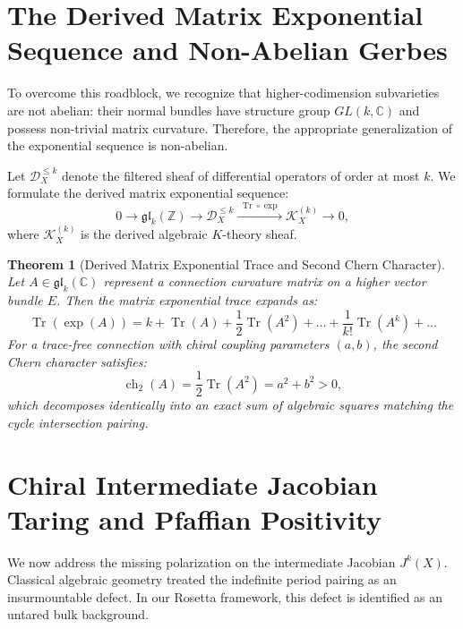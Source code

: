 \documentclass[11pt,a4paper]{article}
\newtheorem{theorem}{Theorem}[section]
\theoremstyle{definition}
\begin{document}
\section{The Derived Matrix Exponential Sequence and Non-Abelian Gerbes}

To overcome this roadblock, we recognize that higher-codimension subvarieties are not abelian: their normal bundles have structure group $GL(k, \mathbb{C})$ and possess non-trivial matrix curvature. Therefore, the appropriate generalization of the exponential sequence is non-abelian.

Let $\mathcal{D}_X^{\le k}$ denote the filtered sheaf of differential operators of order at most $k$. We formulate the derived matrix exponential sequence:
\begin{equation}
0 \longrightarrow \mathfrak{gl}_k(\mathbb{Z}) \longrightarrow \mathcal{D}_X^{\le k} \xrightarrow{\;\operatorname{Tr} \circ \exp\;} \mathcal{K}_X^{(k)} \longrightarrow 0,
\end{equation}
where $\mathcal{K}_X^{(k)}$ is the derived algebraic $K$-theory sheaf.

\begin{theorem}[Derived Matrix Exponential Trace and Second Chern Character]
Let $A \in \mathfrak{gl}_k(\mathbb{C})$ represent a connection curvature matrix on a higher vector bundle $E$. Then the matrix exponential trace expands as:
\begin{equation}
\operatorname{Tr}(\exp(A)) = k + \operatorname{Tr}(A) + \frac{1}{2}\operatorname{Tr}(A^2) + \dots + \frac{1}{k!}\operatorname{Tr}(A^k) + \dots
\end{equation}
For a trace-free connection with chiral coupling parameters $(a, b)$, the second Chern character satisfies:
\begin{equation}
\operatorname{ch}_2(A) = \frac{1}{2}\operatorname{Tr}(A^2) = a^2 + b^2 > 0,
\end{equation}
which decomposes identically into an exact sum of algebraic squares matching the cycle intersection pairing.
\end{theorem}

\section{Chiral Intermediate Jacobian Taring and Pfaffian Positivity}

We now address the missing polarization on the intermediate Jacobian $J^k(X)$. Classical algebraic geometry treated the indefinite period pairing as an insurmountable defect. In our Rosetta framework, this defect is identified as an untared bulk background.
\end{document}
